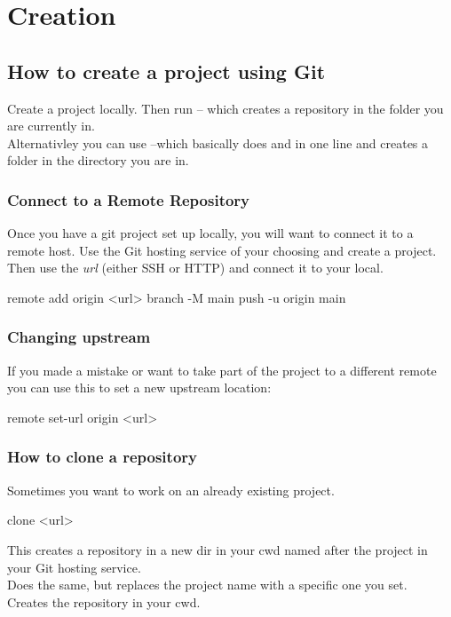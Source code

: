 \chapter{Creation}
\chapteroverlayB

\section{How to create a project using Git}
Create a project locally. Then run  -- which creates a repository in the folder you are currently in.\\
Alternativley you can use   --which basically does  and  in one line and creates a folder in the directory you are in.\\

\subsection{Connect to a Remote Repository}
Once you have a git project set up locally, you will want to connect it to a remote host. Use the Git hosting service of your choosing and create a project. Then use the \textit{url} (either SSH or HTTP) and connect it to your local.
\begin{gitBashBox}
remote add origin <url>
branch -M main
push -u origin main
\end{gitBashBox}

\subsection{Changing upstream}
If you made a mistake or want to take part of the project to a different remote you can use this to set a new upstream location:
\begin{gitBashBox}
remote set-url origin <url>
\end{gitBashBox}

\subsection{How to clone a repository}
Sometimes you want to work on an already existing project. 
\begin{gitBashBox}
clone <url>
\end{gitBashBox}
This creates a repository in a new dir in your cwd named after the project in your Git hosting service.\\
\noindent{}
Does the same, but replaces the project name with a specific one you set.\\
\noindent{}
Creates the repository in your cwd. 
